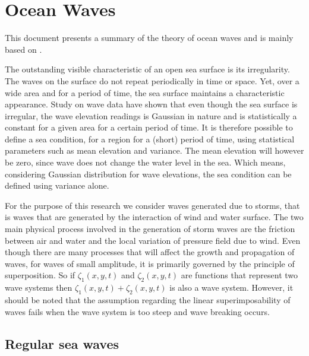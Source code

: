 \section{Ocean Waves} \label{Ocean Waves} 
This document presents a summary of the theory of ocean waves and is mainly 
based on \cite{lewis1988principles}.

The outstanding visible characteristic of an open sea surface is its
irregularity. The waves on the surface do not repeat periodically in time or
space. Yet, over a wide area and for a period of time, the sea surface maintains
a characteristic appearance. Study on wave data have shown that even though the
sea surface is irregular, the wave elevation readings is Gaussian in nature and
is statistically a constant for a given area for a certain period of time. It is
therefore possible to define a sea condition, for a region for a (short) period
of time, using statistical parameters such as mean elevation and variance. The
mean elevation will however be zero, since wave does not change the water level
in the sea. Which means, considering Gaussian distribution for wave elevations,
the sea condition can be defined using variance alone.

For the purpose of this research we consider waves generated due to storms, that
is waves that are generated by the interaction of wind and water surface. The
two main physical process involved in the generation of storm waves are the
friction between air and water and the local variation of pressure field due to
wind. Even though there are many processes that will affect the growth and
propagation of waves, for waves of small amplitude, it is primarily governed by
the principle of superposition. So if $\zeta_1(x,y,t)$ and $\zeta_2(x,y,t)$ are
functions that represent two wave systems then $\zeta_1(x,y,t) + \zeta_2(x,y,t)$
is also a wave system.  However, it should be noted that the assumption
regarding the linear superimposability of waves fails when the wave system is
too steep and wave breaking occurs.

\subsection{Regular sea waves} \label{Regular sea waves}

